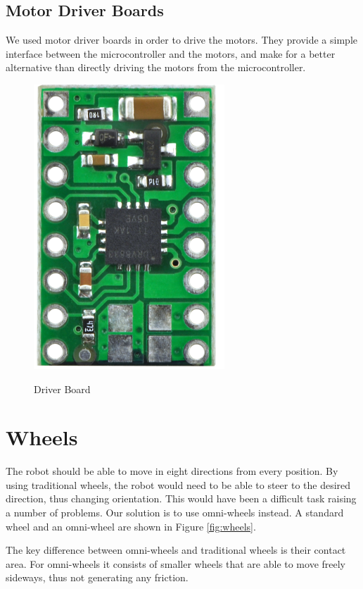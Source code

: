 \subsection{Motor Driver Boards}\label{sec:driver_boards}
We used motor driver boards in order to drive the motors. They provide a simple interface between 
the microcontroller and the motors, and make for a better alternative than directly driving the 
motors from the microcontroller.
\begin{figure}[htp]
	\centering
	\includegraphics[scale=0.5]{figures/move/driver_board}
	\caption{Driver Board}\cite{MGSuperLabs}
\end{figure}
\section{Wheels}\label{sec:wheels}
The robot should be able to move in eight directions from every position.
By using traditional wheels, the robot would need to be able to steer to the desired direction, 
thus changing orientation.
This would have been a difficult task raising a number of problems.
Our solution is to use omni-wheels instead.
A standard wheel and an omni-wheel are shown in Figure \ref{fig:wheels}.

The key difference between omni-wheels and traditional wheels is their contact area.
For omni-wheels it consists of smaller wheels that are able to move freely sideways,
thus not generating any friction.

